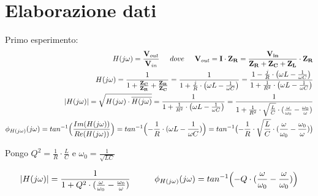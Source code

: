     \section{Elaborazione dati}
    Primo esperimento:
    \begin{equation}
        \begin{split}
            H(j\omega) = \frac{\mathbf{V}_{out}}{\mathbf{V}_{in}}
            \hspace{0.5cm} dove \hspace{0.5cm} \mathbf{V}_{out} = \mathbf{I} \cdot \mathbf{Z_{R}} = \frac{\mathbf{V_{in}}}{\mathbf{Z_R} + \mathbf{Z_C} + \mathbf{Z_L}}
            \cdot \mathbf{Z_R}
            \\
            H(j\omega) =  \frac{1}{1+\frac{\mathbf{Z_C}}{\mathbf{Z_R}} + \frac{\mathbf{Z_R}}{\mathbf{Z_C}}}
            = \frac{1}{1+\frac{j}{R} \cdot \bigl (\omega L - \frac{1}{\omega C} \bigr )} = 
            \frac{1 - \frac{j}{R} \cdot \bigl (\omega L - \frac{1}{\omega C} \bigr )}{1 + \frac{1}{R^2} \cdot \bigl (\omega L - \frac{1}{\omega C} \bigr )}
            \\
            |H(j\omega)| = \sqrt{H(j\omega) \cdot \overline{H(j\omega)}} = \frac{1}{1 + \frac{1}{R^2} \cdot \bigl (\omega L - \frac{1}{\omega C} \bigr )} =
            \frac{1}{1+\frac{1}{R^2}\cdot \sqrt{\frac{L}{C}}\cdot(\frac{\omega}{\omega_0} - \frac{\omega_0}{\omega})} 
            \\
            \phi_{H(j\omega)}(j\omega) = tan^{-1} \Bigl (\frac{Im(H(j\omega))}{Re(H(j\omega))}\Bigr )
            = tan^{-1} \Bigl (-\frac{1}{R} \cdot (\omega L - \frac{1}{\omega C})\Bigr )
            = tan^{-1} \bigl (-\frac{1}{R} \cdot \sqrt{\frac{L}{C}} \cdot (\frac{\omega}{\omega_0} - \frac{\omega_0}{\omega}) \bigr )
        \end{split}
    \end{equation}

    \begin{center}
    Pongo $Q^2 = \frac{1}{R} \cdot \frac{L}{C}$ e $\omega_0 = \frac {1}{\sqrt{LC}}$
    \end{center}

    \begin{equation}
        \begin{split}
            |H(j\omega)| = \frac{1}{1 + Q^2 \cdot (\frac{\omega}{\omega_0} - \frac{\omega_0}{\omega})}
            \hspace{1cm}
            \phi_{H(j\omega)}(j\omega) = tan^{-1} \Bigl (-Q \cdot(\frac{\omega}{\omega_0} - \frac{\omega}{\omega_0}) \Bigr )
        \end{split}
    \end{equation}

